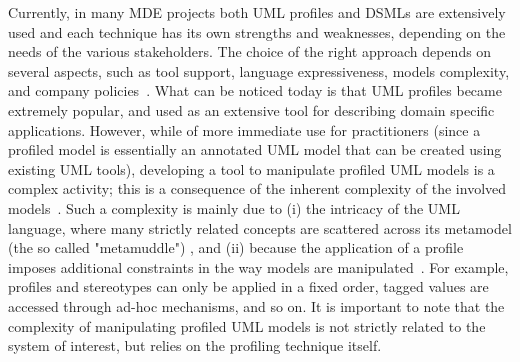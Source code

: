 Currently, in many MDE projects both UML profiles and DSMLs are extensively used and each technique has its own strengths and weaknesses,
depending on the needs of the various stakeholders.
The choice of the right approach depends on several aspects, such as tool support, language expressiveness,
models complexity, and company policies~\cite{comparison}.
What can be noticed today is that UML profiles became extremely popular, and used as an extensive tool for describing domain specific
applications.
However, while of more immediate use for practitioners (since a profiled model is essentially an annotated UML model that can be
created using existing UML tools), developing a tool to manipulate profiled UML models is a complex activity; this is a consequence
of the inherent complexity of the involved models~\cite{comparison}\cite{france}.
Such a complexity is mainly due to
(i) the intricacy of the UML language, where many strictly related concepts are scattered across its metamodel (the so called "metamuddle"\cite{france})
, and (ii) because the application of a profile imposes additional constraints in the way models are manipulated~\cite{UMLprofile}.
For example, profiles and stereotypes can only be applied in a fixed order, tagged values are accessed through ad-hoc mechanisms, and so on.
It is important to note that the complexity of manipulating profiled UML models is not strictly related to
the system of interest, but relies on the profiling technique itself.

